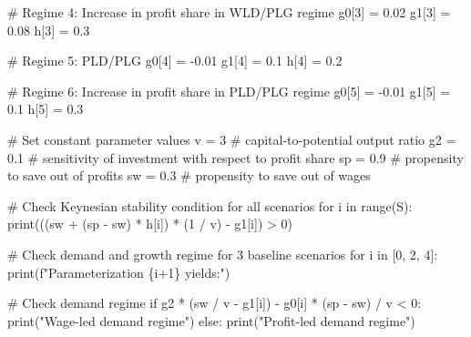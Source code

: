 \documentclass[
  letterpaper,
  DIV=11,
  numbers=noendperiod]{scrreprt}
\newenvironment{Shaded}{\begin{snugshade}}{\end{snugshade}}
\newcommand{\BuiltInTok}[1]{\textcolor[rgb]{0.00,0.23,0.31}{#1}}
\newcommand{\CommentTok}[1]{\textcolor[rgb]{0.37,0.37,0.37}{#1}}
\newcommand{\ControlFlowTok}[1]{\textcolor[rgb]{0.00,0.23,0.31}{#1}}
\newcommand{\DecValTok}[1]{\textcolor[rgb]{0.68,0.00,0.00}{#1}}
\newcommand{\FloatTok}[1]{\textcolor[rgb]{0.68,0.00,0.00}{#1}}
\newcommand{\KeywordTok}[1]{\textcolor[rgb]{0.00,0.23,0.31}{#1}}
\newcommand{\NormalTok}[1]{\textcolor[rgb]{0.00,0.23,0.31}{#1}}
\newcommand{\OperatorTok}[1]{\textcolor[rgb]{0.37,0.37,0.37}{#1}}
\newcommand{\SpecialCharTok}[1]{\textcolor[rgb]{0.37,0.37,0.37}{#1}}
\newcommand{\SpecialStringTok}[1]{\textcolor[rgb]{0.13,0.47,0.30}{#1}}
\newcommand{\StringTok}[1]{\textcolor[rgb]{0.13,0.47,0.30}{#1}}
\begin{document}
\begin{tcolorbox}
\begin{Shaded}
\begin{Highlighting}[]
\CommentTok{\# Regime 4: Increase in profit share in WLD/PLG regime}
\NormalTok{g0[}\DecValTok{3}\NormalTok{] }\OperatorTok{=} \FloatTok{0.02}
\NormalTok{g1[}\DecValTok{3}\NormalTok{] }\OperatorTok{=} \FloatTok{0.08}
\NormalTok{h[}\DecValTok{3}\NormalTok{] }\OperatorTok{=} \FloatTok{0.3}

\CommentTok{\# Regime 5: PLD/PLG}
\NormalTok{g0[}\DecValTok{4}\NormalTok{] }\OperatorTok{=} \OperatorTok{{-}}\FloatTok{0.01}
\NormalTok{g1[}\DecValTok{4}\NormalTok{] }\OperatorTok{=} \FloatTok{0.1}
\NormalTok{h[}\DecValTok{4}\NormalTok{] }\OperatorTok{=} \FloatTok{0.2}

\CommentTok{\# Regime 6: Increase in profit share in PLD/PLG regime}
\NormalTok{g0[}\DecValTok{5}\NormalTok{] }\OperatorTok{=} \OperatorTok{{-}}\FloatTok{0.01}
\NormalTok{g1[}\DecValTok{5}\NormalTok{] }\OperatorTok{=} \FloatTok{0.1}
\NormalTok{h[}\DecValTok{5}\NormalTok{] }\OperatorTok{=} \FloatTok{0.3}

\CommentTok{\# Set constant parameter values}
\NormalTok{v }\OperatorTok{=} \DecValTok{3}    \CommentTok{\# capital{-}to{-}potential output ratio}
\NormalTok{g2 }\OperatorTok{=} \FloatTok{0.1} \CommentTok{\# sensitivity of investment with respect to profit share}
\NormalTok{sp }\OperatorTok{=} \FloatTok{0.9} \CommentTok{\# propensity to save out of profits}
\NormalTok{sw }\OperatorTok{=} \FloatTok{0.3} \CommentTok{\# propensity to save out of wages}

\CommentTok{\# Check Keynesian stability condition for all scenarios}
\ControlFlowTok{for}\NormalTok{ i }\KeywordTok{in} \BuiltInTok{range}\NormalTok{(S):}
    \BuiltInTok{print}\NormalTok{(((sw }\OperatorTok{+}\NormalTok{ (sp }\OperatorTok{{-}}\NormalTok{ sw) }\OperatorTok{*}\NormalTok{ h[i]) }\OperatorTok{*}\NormalTok{ (}\DecValTok{1} \OperatorTok{/}\NormalTok{ v) }\OperatorTok{{-}}\NormalTok{ g1[i]) }\OperatorTok{\textgreater{}} \DecValTok{0}\NormalTok{)}
    
\CommentTok{\# Check demand and growth regime for 3 baseline scenarios}
\ControlFlowTok{for}\NormalTok{ i }\KeywordTok{in}\NormalTok{ [}\DecValTok{0}\NormalTok{, }\DecValTok{2}\NormalTok{, }\DecValTok{4}\NormalTok{]:}
    \BuiltInTok{print}\NormalTok{(}\SpecialStringTok{f"Parameterization }\SpecialCharTok{\{}\NormalTok{i}\OperatorTok{+}\DecValTok{1}\SpecialCharTok{\}}\SpecialStringTok{ yields:"}\NormalTok{)}
    
    \CommentTok{\# Check demand regime}
    \ControlFlowTok{if}\NormalTok{ g2 }\OperatorTok{*}\NormalTok{ (sw }\OperatorTok{/}\NormalTok{ v }\OperatorTok{{-}}\NormalTok{ g1[i]) }\OperatorTok{{-}}\NormalTok{ g0[i] }\OperatorTok{*}\NormalTok{ (sp }\OperatorTok{{-}}\NormalTok{ sw) }\OperatorTok{/}\NormalTok{ v }\OperatorTok{\textless{}} \DecValTok{0}\NormalTok{:}
        \BuiltInTok{print}\NormalTok{(}\StringTok{"Wage{-}led demand regime"}\NormalTok{)}
    \ControlFlowTok{else}\NormalTok{:}
        \BuiltInTok{print}\NormalTok{(}\StringTok{"Profit{-}led demand regime"}\NormalTok{)}
    

\end{Highlighting}
\end{Shaded}
\end{tcolorbox}
\end{document}
